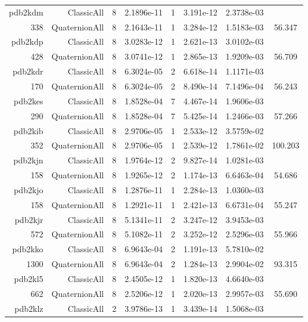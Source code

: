 \begin{xltabular}{\textwidth}{r|rcS[table-format=1.4e+2]cS[table-format=1.3e+2]S[table-format=1.4e+2]S[table-format=-1.3]}
pdb2kdm & ClassicAll & 8 & 2.1896e-11 & 1 & 3.191e-12 & 2.3738e-03 & \\
338 & QuaternionAll & 8 & 2.1643e-11 & 1 & 3.284e-12 & 1.5183e-03 & 56.347\\  \addlinespace
pdb2kdp & ClassicAll & 8 & 3.0283e-12 & 1 & 2.621e-13 & 3.0102e-03 & \\
428 & QuaternionAll & 8 & 3.0741e-12 & 1 & 2.865e-13 & 1.9209e-03 & 56.709\\  \addlinespace
pdb2kdr & ClassicAll & 8 & 6.3024e-05 & 2 & 6.618e-14 & 1.1171e-03 & \\
170 & QuaternionAll & 8 & 6.3024e-05 & 2 & 8.490e-14 & 7.1496e-04 & 56.243\\  \addlinespace
pdb2kes & ClassicAll & 8 & 1.8528e-04 & 7 & 4.467e-14 & 1.9606e-03 & \\
290 & QuaternionAll & 8 & 1.8528e-04 & 7 & 5.425e-14 & 1.2466e-03 & 57.266\\  \addlinespace
pdb2kib & ClassicAll & 8 & 2.9706e-05 & 1 & 2.533e-12 & 3.5759e-02 & \\
352 & QuaternionAll & 8 & 2.9706e-05 & 1 & 2.539e-12 & 1.7861e-02 & 100.203\\  \addlinespace
pdb2kjn & ClassicAll & 8 & 1.9764e-12 & 2 & 9.827e-14 & 1.0281e-03 & \\
158 & QuaternionAll & 8 & 1.9265e-12 & 2 & 1.174e-13 & 6.6463e-04 & 54.686\\  \addlinespace
pdb2kjo & ClassicAll & 8 & 1.2876e-11 & 1 & 2.284e-13 & 1.0360e-03 & \\
158 & QuaternionAll & 8 & 1.2921e-11 & 1 & 2.421e-13 & 6.6731e-04 & 55.247\\  \addlinespace
pdb2kjr & ClassicAll & 8 & 5.1341e-11 & 2 & 3.247e-12 & 3.9453e-03 & \\
572 & QuaternionAll & 8 & 5.1082e-11 & 2 & 3.252e-12 & 2.5296e-03 & 55.966\\  \addlinespace
pdb2kko & ClassicAll & 8 & 6.9643e-04 & 2 & 1.191e-13 & 5.7810e-02 & \\
1300 & QuaternionAll & 8 & 6.9643e-04 & 2 & 1.284e-13 & 2.9904e-02 & 93.315\\  \addlinespace
pdb2kl5 & ClassicAll & 8 & 2.4505e-12 & 1 & 1.820e-13 & 4.6640e-03 & \\
662 & QuaternionAll & 8 & 2.5206e-12 & 1 & 2.020e-13 & 2.9957e-03 & 55.690\\  \addlinespace
pdb2klz & ClassicAll & 2 & 3.9786e-13 & 1 & 3.439e-14 & 1.5068e-03 & \\

\end{xltabular}
